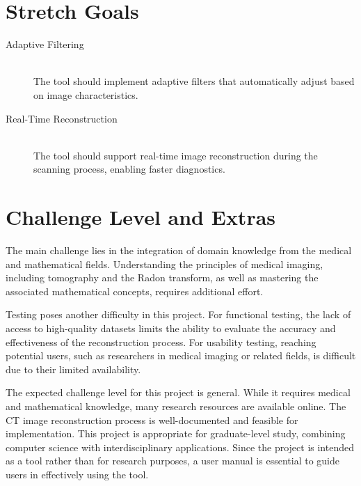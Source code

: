 \documentclass{article}
\begin{document}
\section{Stretch Goals}
\begin{description}
\item[Adaptive Filtering] \hfill \\ The tool should implement adaptive
  filters that automatically adjust based on image characteristics.
\item[Real-Time Reconstruction] \hfill \\ The tool should support real-time
  image reconstruction during the scanning process, enabling faster diagnostics.
\end{description}

\section{Challenge Level and Extras}
The main challenge lies in the integration of domain knowledge from the medical
and mathematical fields. Understanding the principles of medical imaging,
including tomography and the Radon transform, as well as mastering the
associated mathematical concepts, requires additional effort.

Testing poses another difficulty in this project. For functional testing, the
lack of access to high-quality datasets limits the ability to evaluate the
accuracy and effectiveness of the reconstruction process. For usability testing,
reaching potential users, such as researchers in medical imaging or related
fields, is difficult due to their limited availability.

The expected challenge level for this project is general. While it requires
medical and mathematical knowledge, many research resources are available
online. The CT image reconstruction process is well-documented and feasible for
implementation. This project is appropriate for graduate-level study, combining
computer science with interdisciplinary applications. Since the project is
intended as a tool rather than for research purposes, a user manual is essential
to guide users in effectively using the tool.

\newpage
\printbibliography
\end{document}
